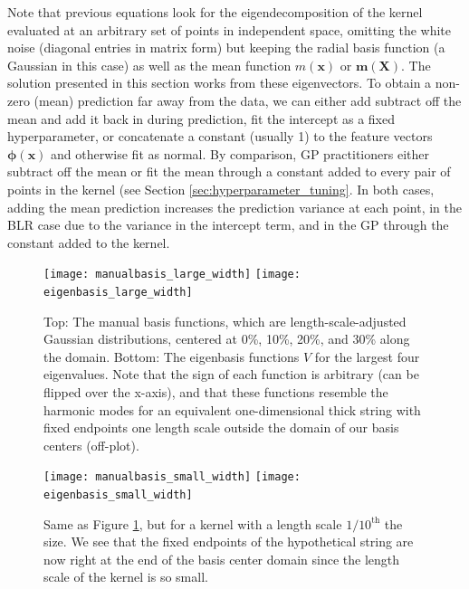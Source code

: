 \documentclass{article}
\begin{document}
Note that previous equations look for the eigendecomposition of the kernel evaluated at an arbitrary set of points in independent space, omitting the white noise (diagonal entries in matrix form) but keeping the radial basis function (a Gaussian in this case) as well as the mean function $m(\mathbf{x})$ or $\mathbf{m}(\mathbf{X})$. The solution presented in this section works from these eigenvectors. To obtain a non-zero (mean) prediction far away from the data, we can either add subtract off the mean and add it back in during prediction, fit the intercept as a fixed hyperparameter, or concatenate a constant (usually 1) to the feature vectors $\boldsymbol{\phi}(\mathbf{x})$ and otherwise fit as normal. By comparison, GP practitioners either subtract off the mean or fit the mean through a constant added to every pair of points in the kernel (see Section \ref{sec:hyperparameter_tuning}. In both cases, adding the mean prediction increases the prediction variance at each point, in the BLR case due to the variance in the intercept term, and in the GP through the constant added to the kernel.

\begin{figure}
    \begin{center}
    \texttt{[image: manualbasis\_large\_width]}
    \texttt{[image: eigenbasis\_large\_width]}
    \caption{Top: The manual basis functions, which are length-scale-adjusted Gaussian distributions, centered at 0\%, 10\%, 20\%, and 30\% along the domain. Bottom: The eigenbasis functions $V$ for the largest four eigenvalues. Note that the sign of each function is arbitrary (can be flipped over the x-axis), and that these functions resemble the harmonic modes for an equivalent one-dimensional thick string with fixed endpoints one length scale outside the domain of our basis centers (off-plot).}
    \label{fig:basis_large_width}
    \end{center}
\end{figure}

\begin{figure}
    \begin{center}
    \texttt{[image: manualbasis\_small\_width]}
    \texttt{[image: eigenbasis\_small\_width]}
    \caption{Same as Figure \ref{fig:basis_large_width}, but for a kernel with a length scale $1/10^{\text{th}}$ the size. We see that the fixed endpoints of the hypothetical string are now right at the end of the basis center domain since the length scale of the kernel is so small.}
    \label{fig:basis_small_width}
    \end{center}
\end{figure}
\end{document}
